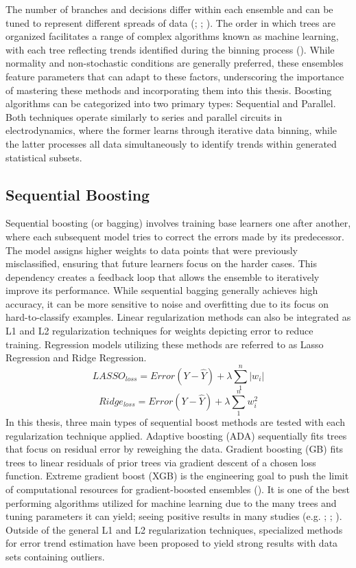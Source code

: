 The number of branches and decisions differ within each ensemble and can be tuned to represent different spreads of data (\cite{keller_machine_2017}; \cite{gagliardi_machine_2020}; \cite{ko_machine-learning-based_2022}). The order in which trees are organized facilitates a range of complex algorithms known as machine learning, with each tree reflecting trends identified during the binning process (\cite{pan_comparison_2023}). While normality and non-stochastic conditions are generally preferred, these ensembles feature parameters that can adapt to these factors, underscoring the importance of mastering these methods and incorporating them into this thesis. Boosting algorithms can be categorized into two primary types: Sequential and Parallel. Both techniques operate similarly to series and parallel circuits in electrodynamics, where the former learns through iterative data binning, while the latter processes all data simultaneously to identify trends within generated statistical subsets. 
\subsection{Sequential Boosting} \label{subs:ml1sb} Sequential boosting (or bagging) involves training base learners one after another, where each subsequent model tries to correct the errors made by its predecessor. The model assigns higher weights to data points that were previously misclassified, ensuring that future learners focus on the harder cases. This dependency creates a feedback loop that allows the ensemble to iteratively improve its performance. While sequential bagging generally achieves high accuracy, it can be more sensitive to noise and overfitting due to its focus on hard-to-classify examples. Linear regularization methods can also be integrated as L1 and L2 regularization techniques for weights depicting error to reduce training. Regression models utilizing these methods are referred to as Lasso Regression and Ridge Regression.
\[LASSO_{loss} = Error(Y - \widehat{Y}) + \lambda \sum_1^n |w_i|\]
\[Ridge_{loss} = Error(Y - \widehat{Y}) +  \lambda \sum_1^n w_i^{2}\]
In this thesis, three main types of sequential boost methods are tested with each regularization technique applied. Adaptive boosting (ADA) sequentially fits trees that focus on residual error by reweighing the data. Gradient boosting (GB) fits trees to linear residuals of prior trees via gradient descent of a chosen loss function. Extreme gradient boost (XGB) is the engineering goal to push the limit of computational resources for gradient-boosted ensembles (\cite{arifali2023}). It is one of the best performing algorithms utilized for machine learning due to the many trees and tuning parameters it can yield; seeing positive results in many studies (e.g. \cite{hu_estimation_2022}; \cite{kang_estimation_2021}; \cite{nabavi_site-scale_2021}). Outside of the general L1 and L2 regularization techniques, specialized methods for error trend estimation have been proposed to yield strong results with data sets containing outliers.
